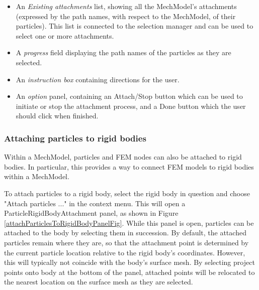 \documentclass{article}
\begin{document}
\begin{itemize}

\item An {\it Existing attachments} list, showing all the MechModel's
attachments (expressed by the path names, with respect to the
MechModel, of their particles). This list is connected to the
selection manager and can be used to select one or more attachments.

\item A {\it progress} field displaying the path names of the particles as
they are selected.

\item An {\it instruction box} containing directions for the user.

\item An {\it option} panel, containing an {\sf Attach/Stop} button which can be used
to initiate or stop the attachment process, and a {\sf Done} button which
the user should click when finished.

\end{itemize}

\subsubsection{Attaching particles to rigid bodies}
\label{particleRigidBodyAttachSec}

Within a MechModel, particles and FEM nodes can also
be attached to rigid bodies. In particular, this provides a way
to connect FEM models to rigid bodies within a MechModel.

To attach particles to a rigid body, select the rigid body in question
and choose {\sf "Attach particles ..."} in the context menu. This will
open a ParticleRigidBodyAttachment panel, as shown in
Figure \ref{attachParticlesToRigidBodyPanelFig}. While this panel is open,
particles can be attached to the body by selecting them in succession.
By default, the attached particles remain where they are, so that the
attachment point is determined by the current particle location
relative to the rigid body's coordinates. However, this will typically
not coincide with the body's surface mesh.  By selecting {\sf project
points onto body} at the bottom of the panel, attached points will be
relocated to the nearest location on the surface mesh as they are
selected.
\end{document}
